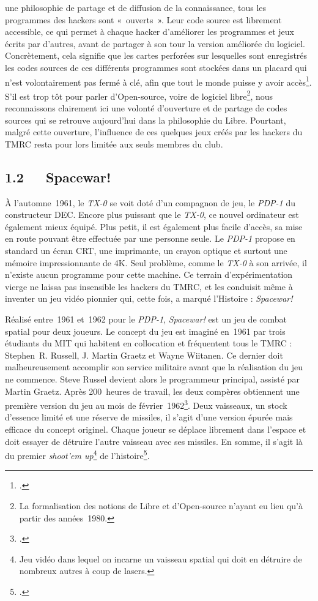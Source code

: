 \documentclass{FramateX}
\begin{document}
\begin{refsection}
une philosophie de partage et de diffusion de la connaissance, tous les
programmes des hackers sont «~ouverts~». Leur code source est librement
accessible, ce qui permet à chaque hacker d'améliorer les programmes et
jeux écrits par d'autres, avant de partager à son tour la version
améliorée du logiciel. Concrètement, cela signifie que les cartes
perforées sur lesquelles sont enregistrés les codes sources de ces
différents programmes sont stockées dans un placard qui n'est
volontairement pas fermé à clé, afin que tout le monde puisse y avoir
accès\footnote{\cite{graetzorigin1981}.}. S'il est trop tôt pour parler d'Open-source,
voire de logiciel libre\footnote{La formalisation des notions de
Libre et d'Open-source n'ayant eu lieu qu'à partir des années~1980.},
nous reconnaissons clairement ici une volonté d'ouverture et de partage
de codes sources qui se retrouve aujourd'hui dans la philosophie du
Libre. Pourtant, malgré cette ouverture, l'influence de ces quelques
jeux créés par les hackers du TMRC resta pour lors limitée aux seuls
membres du club.

\subsection*{1.2~~~Spacewar!}
{}


À l'automne~1961, le \textit{TX-0} se voit
doté d'un compagnon de jeu, le \textit{PDP-1} du constructeur
DEC. Encore plus puissant que le \textit{TX-0},
ce nouvel ordinateur est également mieux équipé. Plus petit, il est
également plus facile d'accès, sa mise en route pouvant être effectuée
par une personne seule. Le \textit{PDP-1} propose en standard un écran
CRT, une imprimante, un crayon optique et surtout une mémoire
impressionnante de 4K. Seul problème, comme le \textit{TX-0} à son arrivée, il n'existe
aucun programme pour cette machine. Ce terrain d'expérimentation vierge
ne laissa pas insensible les hackers du TMRC, et les conduisit même à
inventer un jeu vidéo pionnier qui, cette fois, a marqué l'Histoire : \textit{Spacewar!}

Réalisé entre~1961 et~1962 pour le \textit{PDP-1}, \textit{Spacewar!} est un jeu de combat
spatial pour deux joueurs. Le concept du jeu est imaginé en~1961 par
trois étudiants du MIT qui habitent en collocation et fréquentent tous
le TMRC : Stephen~R. Russell, J. Martin Graetz et Wayne Wiitanen. Ce
dernier doit malheureusement accomplir son service militaire avant que
la réalisation du jeu ne commence. Steve Russel devient alors le
programmeur principal, assisté par Martin Graetz. Après 200~heures de
travail, les deux compères obtiennent une première version du jeu au
mois de février~1962\footnote{\cite{graetzorigin1981}.}. Deux vaisseaux, un stock d'essence
limité et une réserve de missiles, il s'agit d'une version épurée mais
efficace du concept originel. Chaque joueur se déplace librement dans
l'espace et doit essayer de détruire l'autre vaisseau avec ses
missiles. En somme, il s'agit là du
premier \textit{shoot'em up}\footnote{Jeu
vidéo dans lequel on incarne un vaisseau spatial qui doit en détruire
de nombreux autres à coup de lasers.} de l'histoire\footnote{\cite{kentultimate2001}.}. 


\end{refsection}
\end{document}
